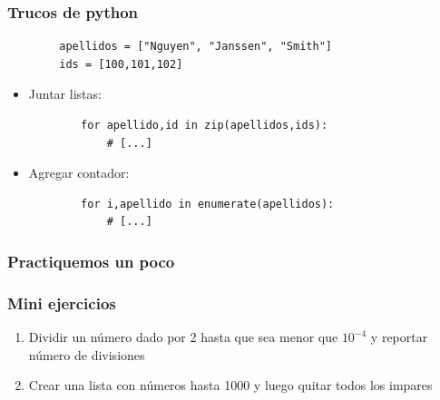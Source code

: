 \documentclass[14pt,aspectratio=169,xcolor=dvipsnames]{beamer}
\begin{document}
\begin{frame}[fragile]\frametitle{Trucos de python}
    \begin{verbatim}
        apellidos = ["Nguyen", "Janssen", "Smith"]
        ids = [100,101,102]
    \end{verbatim}
    \begin{itemize}
        \item Juntar listas:
        \begin{verbatim}
        for apellido,id in zip(apellidos,ids):
            # [...]
    \end{verbatim}
        \item Agregar contador:
    \begin{verbatim}
        for i,apellido in enumerate(apellidos):
            # [...]
    \end{verbatim}
    \end{itemize}
\end{frame}
\begin{frame}\frametitle{Practiquemos un poco}
\end{frame}
\begin{frame}
    \maketitle
\end{frame}
\begin{frame}\frametitle{Mini ejercicios}
    \begin{enumerate}
        \item Dividir un número dado por 2 hasta que sea menor que $10^{-4}$ y reportar número de divisiones
        \item Crear una lista con números hasta 1000 y luego quitar todos los impares
    \end{enumerate}
\end{frame}
\end{document}
